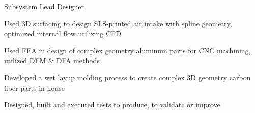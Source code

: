 \begin{cventries}
  \cventry
    {Subsystem Lead Designer} %
    {} %
    {} %
    {} %
    {
      \begin{cvitems} %
        \item{Used 3D surfacing to design SLS-printed air intake with spline geometry, optimized internal flow utilizing CFD}
        \item{Used FEA in design of complex geometry aluminum parts for CNC machining, utilized DFM \& DFA methods}
        \item{Developed a wet layup molding process to create complex 3D geometry carbon fiber parts in house}
        \item{Designed, built and executed tests to produce, to validate or improve}
      \end{cvitems}
    }
    
    

\end{cventries}
